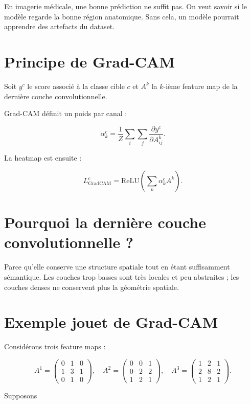 \documentclass[11pt,a4paper]{article}
\begin{document}
En imagerie médicale, une bonne prédiction ne suffit pas. On veut savoir si le modèle regarde la bonne région anatomique. Sans cela, un modèle pourrait apprendre des artefacts du dataset.

\section{Principe de Grad-CAM}

Soit $y^c$ le score associé à la classe cible $c$ et $A^k$ la $k$-ième feature map de la dernière couche convolutionnelle.

Grad-CAM définit un poids par canal :

\[
\alpha_k^c = \frac{1}{Z}\sum_i\sum_j \frac{\partial y^c}{\partial A_{ij}^k}.
\]

La heatmap est ensuite :

\[
L_{\mathrm{GradCAM}}^c = \mathrm{ReLU}\left(\sum_k \alpha_k^c A^k\right).
\]

\section{Pourquoi la dernière couche convolutionnelle ?}

Parce qu'elle conserve une structure spatiale tout en étant suffisamment sémantique. Les couches trop basses sont très locales et peu abstraites ; les couches denses ne conservent plus la géométrie spatiale.

\section{Exemple jouet de Grad-CAM}

Considérons trois feature maps :

\[
A^1=
\begin{pmatrix}
0 & 1 & 0 \\
1 & 3 & 1 \\
0 & 1 & 0
\end{pmatrix},
\quad
A^2=
\begin{pmatrix}
0 & 0 & 1 \\
0 & 2 & 2 \\
1 & 2 & 1
\end{pmatrix},
\quad
A^3=
\begin{pmatrix}
1 & 2 & 1 \\
2 & 8 & 2 \\
1 & 2 & 1
\end{pmatrix}.
\]

Supposons
\end{document}
